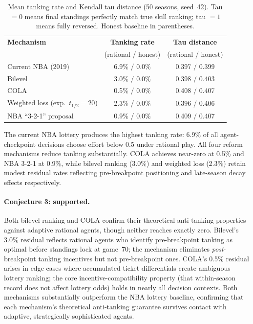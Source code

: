 \documentclass{article}
\begin{document}
\begin{table}[h]
\centering
\renewcommand{\arraystretch}{1.3}
\begin{tabular}{lcc}
\toprule
\textbf{Mechanism} & \textbf{Tanking rate} & \textbf{Tau distance} \\
                   & (rational / honest)   & (rational / honest) \\
\midrule
Current NBA (2019)           & 6.9\% / 0.0\% & 0.397 / 0.399 \\
Bilevel \citep{kazachkov2020} & 3.0\% / 0.0\% & 0.398 / 0.403 \\
COLA \citep{highley2026}      & 0.5\% / 0.0\% & 0.408 / 0.407 \\
Weighted loss (exp.\ $t_{1/2}=20$) & 2.3\% / 0.0\% & 0.396 / 0.406 \\
NBA ``3-2-1'' proposal       & 0.9\% / 0.0\% & 0.409 / 0.407 \\
\bottomrule
\end{tabular}
\caption{Mean tanking rate and Kendall tau distance (50 seasons, seed~42).
Tau $= 0$ means final standings perfectly match true skill ranking;
tau $= 1$ means fully reversed. Honest baseline in parentheses.}
\label{tab:results}
\end{table}

The current NBA lottery produces the highest tanking rate: 6.9\% of all
agent-checkpoint decisions choose effort below 0.5 under rational play.
All four reform mechanisms reduce tanking substantially.
COLA achieves near-zero at 0.5\% and NBA 3-2-1 at 0.9\%, while bilevel
ranking (3.0\%) and weighted loss (2.3\%) retain modest residual rates
reflecting pre-breakpoint positioning and late-season decay effects
respectively.

\paragraph{Conjecture 3: supported.}
Both bilevel ranking and COLA confirm their theoretical anti-tanking
properties against adaptive rational agents, though neither reaches exactly
zero.
Bilevel's 3.0\% residual reflects rational agents who identify pre-breakpoint
tanking as optimal before standings lock at game~70; the mechanism eliminates
\emph{post}-breakpoint tanking incentives but not pre-breakpoint ones.
COLA's 0.5\% residual arises in edge cases where accumulated ticket
differentials create ambiguous lottery ranking; the core incentive-compatibility
property (that within-season record does not affect lottery odds) holds in
nearly all decision contexts.
Both mechanisms substantially outperform the NBA lottery baseline, confirming
that each mechanism's theoretical anti-tanking guarantee survives contact with
adaptive, strategically sophisticated agents.
\end{document}
